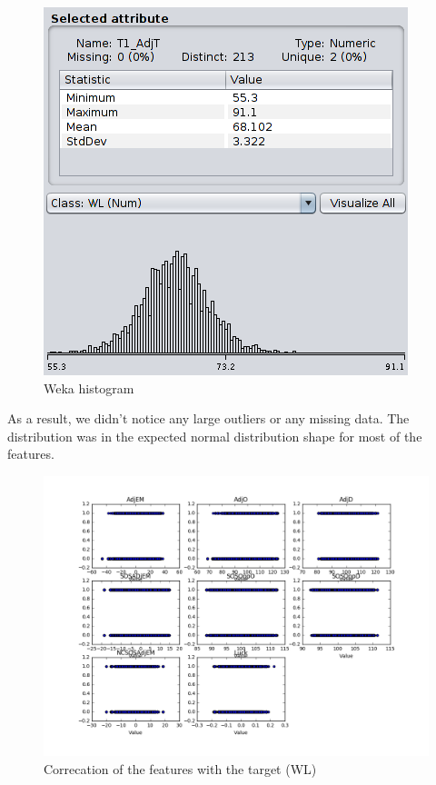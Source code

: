 \documentclass[
10pt, %
a4paper, %
oneside, %
headinclude,footinclude, %
BCOR5mm, %
]{scrartcl}
\begin{document}
\begin{figure}[H]
\caption{Weka histogram}
  \centering
\includegraphics[width=\textwidth]{Weka_Histogram4.png}
\end{figure}

As a result, we didn’t notice any large outliers or any missing data. The distribution was in the expected normal distribution shape for most of the features.

\begin{figure}[H]
\caption{Correcation of the features with the target (WL)}
  \centering
\includegraphics[width=\textwidth]{Correlation1}
\end{figure}
\end{document}
